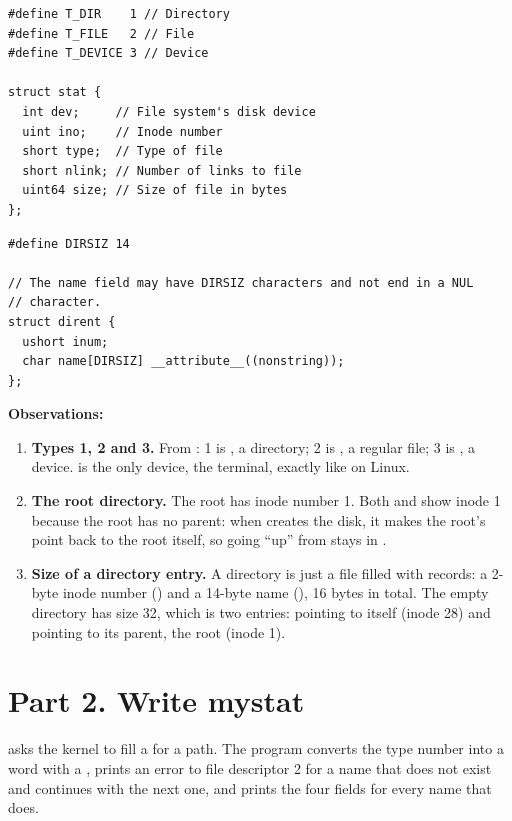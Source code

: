 \documentclass[11pt,a4paper]{article}
\begin{document}
\begin{lstlisting}[style=ccode,caption={File types and struct stat in kernel/stat.h}]
#define T_DIR    1 // Directory
#define T_FILE   2 // File
#define T_DEVICE 3 // Device

struct stat {
  int dev;     // File system's disk device
  uint ino;    // Inode number
  short type;  // Type of file
  short nlink; // Number of links to file
  uint64 size; // Size of file in bytes
};
\end{lstlisting}

\begin{lstlisting}[style=ccode,firstnumber=54,caption={A directory entry in kernel/fs.h}]
#define DIRSIZ 14

// The name field may have DIRSIZ characters and not end in a NUL
// character.
struct dirent {
  ushort inum;
  char name[DIRSIZ] __attribute__((nonstring));
};
\end{lstlisting}

\textbf{Observations:}
\begin{enumerate}
  \item \textbf{Types 1, 2 and 3.} From : 1 is , a directory;
  2 is , a regular file; 3 is , a device.  is the
  only device, the terminal, exactly like  on Linux.
  \item \textbf{The root directory.} The root has inode number 1. Both  and
   show inode 1 because the root has no parent: when  creates the disk, it
  makes the root's  point back to the root itself, so going ``up'' from \code{/}
  stays in \code{/}.
  \item \textbf{Size of a directory entry.} A directory is just a file filled with
   records: a 2-byte inode number () and a 14-byte name
  (), 16 bytes in total. The empty directory  has size 32, which is two
  entries:  pointing to  itself (inode 28) and  pointing to its
  parent, the root (inode 1).
\end{enumerate}

\section{Part 2. Write mystat}

 asks the kernel to fill a  for a path. The program converts
the type number into a word with a , prints an error to file descriptor 2 for a
name that does not exist and continues with the next one, and prints the four fields for every
name that does.
\end{document}
